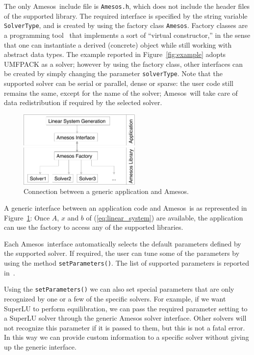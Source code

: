 \documentclass[acmtoms,acmnow]{acmtrans2m}
\newcommand{\amesos}{{\sc Amesos}}
\begin{document}
The only \amesos\ include file is \verb!Amesos.h!, which does not
include the header files of the supported library. The required
interface is specified by the string variable \verb!SolverType!, and
is created by using the factory class \verb!Amesos!. Factory classes
are a programming tool~\cite{alexandrescu01modern} that implements a
sort of ``virtual constructor,'' in the sense that one can
instantiate a derived (concrete) object while still working with
abstract data types. The example reported in
Figure~\ref{fig:example} adopts UMFPACK as a solver; however by
using the factory class, other interfaces can be created by simply
changing the parameter {\tt solverType}. Note that the supported
solver can be serial or parallel,
  dense or sparse: the user code still remains the same, except for the name
  of the solver;
  \amesos\ will take care of data redistribution if required by the selected
  solver.

\begin{figure}
\begin{center}
\includegraphics[width=6cm]{amesos_and_application.pdf}
\end{center}
\caption{Connection between a generic application and \amesos.}
\label{fig:app}
\end{figure}

A generic interface between an application code and \amesos\ is as
represented in Figure~\ref{fig:app}: Once $A$, $x$ and $b$ of
(\ref{eq:linear_system}) are available, the application can use the
factory to access any of the supported libraries.

Each \amesos\ interface automatically selects the default parameters
defined by the supported solver. If required, the user can tune some
of the parameters by using the method \verb!setParameters()!. The
list of supported parameters is reported
in~\cite{Amesos-Reference-Guide}.

Using the \verb!setParameters()! we can also set special parameters
that are only recognized by one or a few of the specific solvers.
For example, if we want SuperLU to perform equilibration, we can
pass the required parameter setting to a SuperLU solver through the
generic Amesos solver interface.  Other solvers will not recognize
this parameter if it is passed to them, but this is not a fatal
error.  In this way we can provide custom information to a specific
solver without giving up the generic interface.
\end{document}
